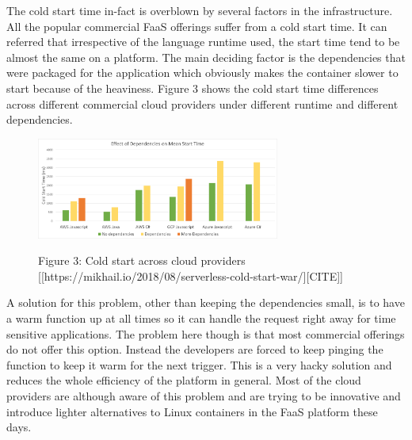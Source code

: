 \documentclass[12pt,titlepage]{article}
\begin{document}
The cold start time in-fact is overblown by several factors in the
infrastructure. All the popular commercial FaaS offerings suffer from a cold
start time. It can referred that irrespective of the language runtime used, the
start time tend to be almost the same on a platform. The main deciding factor is
the dependencies that were packaged for the application which obviously makes
the container slower to start because of the heaviness. Figure 3 shows the cold
start time differences across different commercial cloud providers under
different runtime and different dependencies.

\begin{figure}[!h]
    \caption{Figure 3: Cold start across cloud providers [[https://mikhail.io/2018/08/serverless-cold-start-war/][CITE]]}
    \centering
    \includegraphics[width=80mm]{./thesis_images/cold_start.png}
    \label{fig:cold_strt}
\end{figure}

A solution for this problem, other than keeping the dependencies small, is to
have a warm function up at all times so it can handle the request right away for
time sensitive applications. The problem here though is that most commercial
offerings do not offer this option. Instead the developers are forced to keep
pinging the function to keep it warm for the next trigger. This is a very hacky
solution and reduces the whole efficiency of the platform in general. Most of
the cloud providers are although aware of this problem and are trying to be
innovative and introduce lighter alternatives to Linux containers in the FaaS
platform these days.
\end{document}
